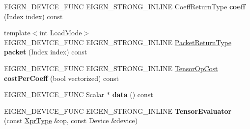 \begin{DoxyCompactItemize}
E\+I\+G\+E\+N\+\_\+\+D\+E\+V\+I\+C\+E\+\_\+\+F\+U\+NC E\+I\+G\+E\+N\+\_\+\+S\+T\+R\+O\+N\+G\+\_\+\+I\+N\+L\+I\+NE Coeff\+Return\+Type {\bfseries coeff} (Index index) const
\item 
\mbox{\label{struct_eigen_1_1_tensor_evaluator_3_01const_01_tensor_striding_op_3_01_strides_00_01_arg_type_01_4_00_01_device_01_4_a4c7637daf6f89f8b6043eb1f838d8c20}} 
{\footnotesize template$<$int Load\+Mode$>$ }\\E\+I\+G\+E\+N\+\_\+\+D\+E\+V\+I\+C\+E\+\_\+\+F\+U\+NC E\+I\+G\+E\+N\+\_\+\+S\+T\+R\+O\+N\+G\+\_\+\+I\+N\+L\+I\+NE \hyperlink{group___sparse_core___module}{Packet\+Return\+Type} {\bfseries packet} (Index index) const
\item 
\mbox{\label{struct_eigen_1_1_tensor_evaluator_3_01const_01_tensor_striding_op_3_01_strides_00_01_arg_type_01_4_00_01_device_01_4_a887bd412e3ef53ff4baec5032abd709a}} 
E\+I\+G\+E\+N\+\_\+\+D\+E\+V\+I\+C\+E\+\_\+\+F\+U\+NC E\+I\+G\+E\+N\+\_\+\+S\+T\+R\+O\+N\+G\+\_\+\+I\+N\+L\+I\+NE \hyperlink{class_eigen_1_1_tensor_op_cost}{Tensor\+Op\+Cost} {\bfseries cost\+Per\+Coeff} (bool vectorized) const
\item 
\mbox{\label{struct_eigen_1_1_tensor_evaluator_3_01const_01_tensor_striding_op_3_01_strides_00_01_arg_type_01_4_00_01_device_01_4_a9d534166669015048106b56f7ca1aa96}} 
E\+I\+G\+E\+N\+\_\+\+D\+E\+V\+I\+C\+E\+\_\+\+F\+U\+NC Scalar $\ast$ {\bfseries data} () const
\item 
\mbox{\label{struct_eigen_1_1_tensor_evaluator_3_01const_01_tensor_striding_op_3_01_strides_00_01_arg_type_01_4_00_01_device_01_4_a7032861fc72a3180b99f3c56a672866f}} 
E\+I\+G\+E\+N\+\_\+\+D\+E\+V\+I\+C\+E\+\_\+\+F\+U\+NC E\+I\+G\+E\+N\+\_\+\+S\+T\+R\+O\+N\+G\+\_\+\+I\+N\+L\+I\+NE {\bfseries Tensor\+Evaluator} (const \hyperlink{class_eigen_1_1_tensor_striding_op}{Xpr\+Type} \&op, const Device \&device)
\item 
\mbox{\label{struct_eigen_1_1_tensor_evaluator_3_01const_01_tensor_striding_op_3_01_strides_00_01_arg_type_01_4_00_01_device_01_4_a5c8d32467a59b42d7c5ee6b57450095b}} 

\end{DoxyCompactItemize}
